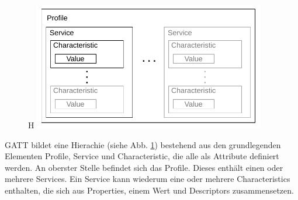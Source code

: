 \begin{figure}{H}
    \centering
    \includegraphics[width=0.9\textwidth]{graphics/gatt_hierarchie.pdf}
    \caption[]{\cite{BtSpec4.0_fig_1892}}
    \label{fig: gatt hierarchie}
\end{figure}

GATT bildet eine Hierachie (siehe Abb. \ref{fig: gatt hierarchie}) bestehend aus den grundlegenden Elementen Profile, Service und Characteristic, die alle als Attribute definiert werden. An oberster Stelle befindet sich das Profile. Dieses enthält einen oder mehrere Services. Ein Service kann wiederum eine oder mehrere Characteristics enthalten, die sich aus Properties, einem Wert und Descriptors zusammensetzen.
